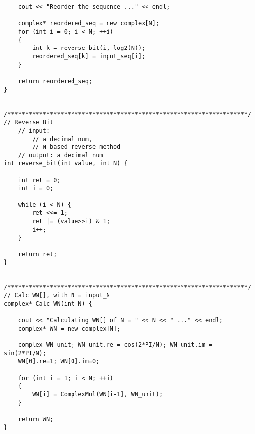 \begin{lstlisting}
	cout << "Reorder the sequence ..." << endl;

	complex* reordered_seq = new complex[N];
	for (int i = 0; i < N; ++i)
	{
		int k = reverse_bit(i, log2(N));
		reordered_seq[k] = input_seq[i];
	}

	return reordered_seq;
}


/********************************************************************/
// Reverse Bit
	// input: 
		// a decimal num, 
		// N-based reverse method
	// output: a decimal num
int reverse_bit(int value, int N) {

	int ret = 0;
	int i = 0;

	while (i < N) {
		ret <<= 1;
		ret |= (value>>i) & 1;
		i++;
	}

	return ret;
}


/********************************************************************/
// Calc WN[], with N = input_N
complex* Calc_WN(int N) {

	cout << "Calculating WN[] of N = " << N << " ..." << endl;
	complex* WN = new complex[N];

	complex WN_unit; WN_unit.re = cos(2*PI/N); WN_unit.im = -sin(2*PI/N);
	WN[0].re=1; WN[0].im=0;

	for (int i = 1; i < N; ++i)
	{
		WN[i] = ComplexMul(WN[i-1], WN_unit);
	}

	return WN;
}
\end{lstlisting}

